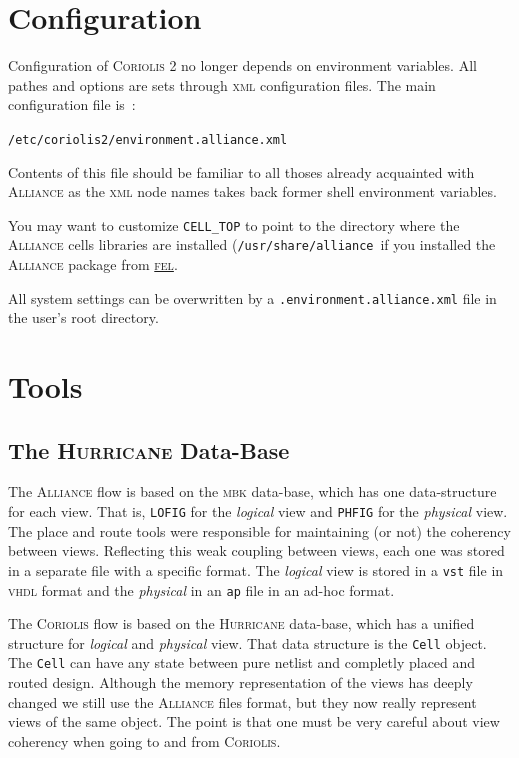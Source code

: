 \documentclass[11pt]{article}
\newcommand{\xhref}        [2]{\href{#2}{#1}}
\newcommand{\xhref}        [2]{\htmladdnormallink{#1}{#2}}
\newcommand {\XML}                {\textsc{xml}\xspace}
\newcommand {\VHDL}               {\textsc{vhdl}\xspace}
\newcommand {\FEL}                {\xhref{\textsc{fel}}{http://spins.fedoraproject.org/fel/}\xspace}
\newcommand {\physical}           {\textit{physical}\xspace}
\newcommand {\logical}            {\textit{logical}\xspace}
\newcommand {\Alliance}           {\textsc{Alliance}\xspace}
\newcommand {\MBK}                {\textsc{mbk}\xspace}
\newcommand {\vst}                {\texttt{vst}\xspace}
\newcommand {\ap}                 {\texttt{ap}\xspace}
\newcommand {\PHFIG}              {\texttt{PHFIG}\xspace}
\newcommand {\LOFIG}              {\texttt{LOFIG}\xspace}
\newcommand {\Coriolis}           {\textsc{Coriolis}\xspace}
\newcommand {\CoriolisII}         {\textsc{Coriolis 2}\xspace}
\newcommand {\Hurricane}          {\textsc{Hurricane}\xspace}
\newcommand {\CELLTOP}            {\texttt{CELL\_TOP}\xspace}
\newcommand {\confcoriolisIIalc}  {\texttt{/etc/coriolis2/environment.alliance.xml}\xspace}
\newcommand {\usercoriolisIIalc}  {\texttt{.environment.alliance.xml}\xspace}
\newcommand {\Cell}               {\texttt{Cell}\xspace}
\begin{document}
 \section{Configuration}

 Configuration of \CoriolisII no longer depends on environment variables.
 All pathes and options are sets through \XML configuration files. The main
 configuration file is~:
 \begin{center}
   \confcoriolisIIalc
 \end{center}
  Contents of this file should be familiar to all thoses already acquainted
  with \Alliance as the \XML node names takes back former shell environment
  variables.

  You may want to customize \CELLTOP to point to the directory where the \Alliance cells
  libraries are installed (\texttt{/usr/share/alliance}\ if you installed
  the \Alliance package from \FEL.

  All system settings can be overwritten by a \usercoriolisIIalc file in the
  user's root directory.


  \section{Tools}

  \subsection{The \Hurricane Data-Base}

  The \Alliance flow is based on the \MBK data-base, which has one data-structure
  for each view. That is, \LOFIG for the \logical view and \PHFIG for the \physical
  view. The place and route tools were responsible for maintaining (or not) the
  coherency between views. Reflecting this weak coupling between views, each one
  was stored in a separate file with a specific format. The \logical view is stored
  in a \vst file in \VHDL format and the \physical in an \ap file in an ad-hoc format.

  The \Coriolis flow is based on the \Hurricane data-base, which has a unified
  structure for \logical and \physical view. That data structure is the \Cell object.
  The \Cell can have any state between pure netlist and completly placed and
  routed design. Although the memory representation of the views has deeply
  changed we still use the \Alliance files format, but they now really represent
  views of the same object. The point is that one must be very careful about
  view coherency when going to and from \Coriolis.
\end{document}
